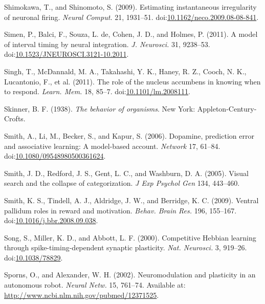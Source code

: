 \documentclass[
  11pt,
  a4paper,
]{scrbook}
\newlength{\cslhangindent}
\newenvironment{CSLReferences}[2] %
 {\begin{list}{}{%
  \setlength{\itemindent}{0pt}
  \setlength{\leftmargin}{0pt}
  \setlength{\parsep}{0pt}
  \ifodd #1
   \setlength{\leftmargin}{\cslhangindent}
   \setlength{\itemindent}{-1\cslhangindent}
  \fi
  \setlength{\itemsep}{#2\baselineskip}}}
 {\end{list}}
\begin{document}
\begin{CSLReferences}{1}{1}
Shimokawa, T., and Shinomoto, S. (2009). {Estimating instantaneous
irregularity of neuronal firing.} \emph{Neural Comput.} 21, 1931--51.
doi:\href{https://doi.org/10.1162/neco.2009.08-08-841}{10.1162/neco.2009.08-08-841}.

Simen, P., Balci, F., Souza, L. de, Cohen, J. D., and Holmes, P. (2011).
{A model of interval timing by neural integration.} \emph{J. Neurosci.}
31, 9238--53.
doi:\href{https://doi.org/10.1523/JNEUROSCI.3121-10.2011}{10.1523/JNEUROSCI.3121-10.2011}.

Singh, T., McDannald, M. A., Takahashi, Y. K., Haney, R. Z., Cooch, N.
K., Lucantonio, F., et al. (2011). {The role of the nucleus accumbens in
knowing when to respond.} \emph{Learn. Mem.} 18, 85--7.
doi:\href{https://doi.org/10.1101/lm.2008111}{10.1101/lm.2008111}.

Skinner, B. F. (1938). \emph{The behavior of organisms}. New York:
Appleton-Century-Crofts.

Smith, A., Li, M., Becker, S., and Kapur, S. (2006). Dopamine,
prediction error and associative learning: A model-based account.
\emph{Network} 17, 61--84.
doi:\href{https://doi.org/10.1080/09548980500361624}{10.1080/09548980500361624}.

Smith, J. D., Redford, J. S., Gent, L. C., and Washburn, D. A. (2005).
Visual search and the collapse of categorization. \emph{J Exp Psychol
Gen} 134, 443--460.

Smith, K. S., Tindell, A. J., Aldridge, J. W., and Berridge, K. C.
(2009). {Ventral pallidum roles in reward and motivation.} \emph{Behav.
Brain Res.} 196, 155--167.
doi:\href{https://doi.org/10.1016/j.bbr.2008.09.038}{10.1016/j.bbr.2008.09.038}.

Song, S., Miller, K. D., and Abbott, L. F. (2000). {Competitive Hebbian
learning through spike-timing-dependent synaptic plasticity.} \emph{Nat.
Neurosci.} 3, 919--26.
doi:\href{https://doi.org/10.1038/78829}{10.1038/78829}.

Sporns, O., and Alexander, W. H. (2002). {Neuromodulation and plasticity
in an autonomous robot.} \emph{Neural Netw.} 15, 761--74. Available at:
\url{http://www.ncbi.nlm.nih.gov/pubmed/12371525}.


\end{CSLReferences}
\end{document}
